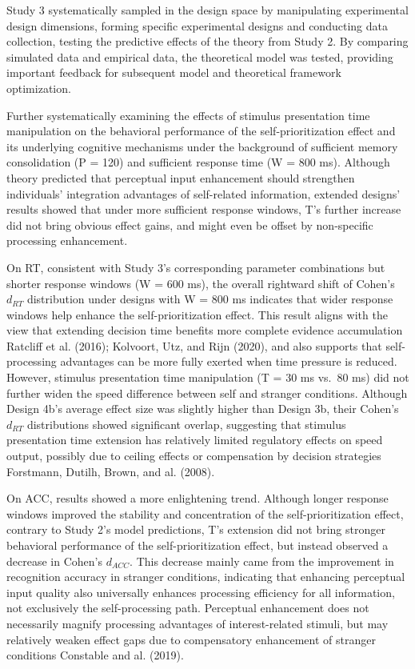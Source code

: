 \documentclass[
  english,
  man,floatsintext]{apa6}
\begin{document}
Study 3 systematically sampled in the design space by manipulating experimental design dimensions, forming specific experimental designs and conducting data collection, testing the predictive effects of the theory from Study 2. By comparing simulated data and empirical data, the theoretical model was tested, providing important feedback for subsequent model and theoretical framework optimization.

Further systematically examining the effects of stimulus presentation time manipulation on the behavioral performance of the self-prioritization effect and its underlying cognitive mechanisms under the background of sufficient memory consolidation (P = 120) and sufficient response time (W = 800 ms). Although theory predicted that perceptual input enhancement should strengthen individuals' integration advantages of self-related information, extended designs' results showed that under more sufficient response windows, T's further increase did not bring obvious effect gains, and might even be offset by non-specific processing enhancement.

On RT, consistent with Study 3's corresponding parameter combinations but shorter response windows (W = 600 ms), the overall rightward shift of Cohen's \(d_{RT}\) distribution under designs with W = 800 ms indicates that wider response windows help enhance the self-prioritization effect. This result aligns with the view that extending decision time benefits more complete evidence accumulation Ratcliff et al. (2016); Kolvoort, Utz, and Rijn (2020), and also supports that self-processing advantages can be more fully exerted when time pressure is reduced. However, stimulus presentation time manipulation (T = 30 ms vs.~80 ms) did not further widen the speed difference between self and stranger conditions. Although Design 4b's average effect size was slightly higher than Design 3b, their Cohen's \(d_{RT}\) distributions showed significant overlap, suggesting that stimulus presentation time extension has relatively limited regulatory effects on speed output, possibly due to ceiling effects or compensation by decision strategies Forstmann, Dutilh, Brown, and al. (2008).

On ACC, results showed a more enlightening trend. Although longer response windows improved the stability and concentration of the self-prioritization effect, contrary to Study 2's model predictions, T's extension did not bring stronger behavioral performance of the self-prioritization effect, but instead observed a decrease in Cohen's \(d_{ACC}\). This decrease mainly came from the improvement in recognition accuracy in stranger conditions, indicating that enhancing perceptual input quality also universally enhances processing efficiency for all information, not exclusively the self-processing path. Perceptual enhancement does not necessarily magnify processing advantages of interest-related stimuli, but may relatively weaken effect gaps due to compensatory enhancement of stranger conditions Constable and al. (2019).
\end{document}
